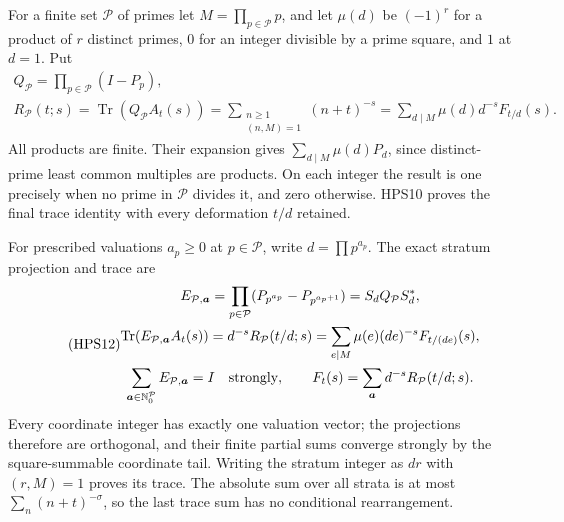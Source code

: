 For a finite set $\mathcal P$ of primes let
$M=\prod_{p\in\mathcal P}p$, and let $\mu(d)$ be
$(-1)^r$ for a product of $r$ distinct primes,
$0$ for an integer divisible by a prime square,
and $1$ at $d=1$. Put
\begin{equation}\tag{HPS11}
\begin{gathered}
 Q_{\mathcal P}=\prod_{p\in\mathcal P}(I-P_p),\\
 R_{\mathcal P}(t;s)=\operatorname{Tr}
                   (Q_{\mathcal P}A_t(s))
   =\sum_{\substack{n\ge1\\(n,M)=1}}(n+t)^{-s}
   =\sum_{d\mid M}\mu(d)d^{-s}F_{t/d}(s).
\end{gathered}
\end{equation}
All products are finite. Their expansion gives
$\sum_{d\mid M}\mu(d)P_d$, since distinct-prime
least common multiples are products. On each
integer the result is one precisely when no
prime in $\mathcal P$ divides it, and zero
otherwise. HPS10 proves the final trace
identity with every deformation $t/d$ retained.

For prescribed valuations $a_p\ge0$ at
$p\in\mathcal P$, write $d=\prod p^{a_p}$.
The exact stratum projection and trace are
\begin{equation}\tag{HPS12}
\begin{gathered}
 E_{\mathcal P,\boldsymbol a}
   =\prod_{p\in\mathcal P}
                (P_{p^{a_p}}-P_{p^{a_p+1}})
   =S_dQ_{\mathcal P}S_d^*,\\
 \operatorname{Tr}(E_{\mathcal P,\boldsymbol a}A_t(s))
        =d^{-s}R_{\mathcal P}(t/d;s)
        =\sum_{e\mid M}\mu(e)(de)^{-s}F_{t/(de)}(s),\\
 \sum_{\boldsymbol a\in\mathbb N_0^{\mathcal P}}
       E_{\mathcal P,\boldsymbol a}=I
                     \quad\hbox{strongly},\qquad
 F_t(s)=\sum_{\boldsymbol a}
                    d^{-s}R_{\mathcal P}(t/d;s).
\end{gathered}
\end{equation}
Every coordinate integer has exactly one valuation
vector; the projections therefore are orthogonal,
and their finite partial sums converge strongly by
the square-summable coordinate tail.
Writing the stratum integer as $dr$ with $(r,M)=1$
proves its trace. The absolute sum over all strata
is at most $\sum_n(n+t)^{-\sigma}$, so the last
trace sum has no conditional rearrangement.

